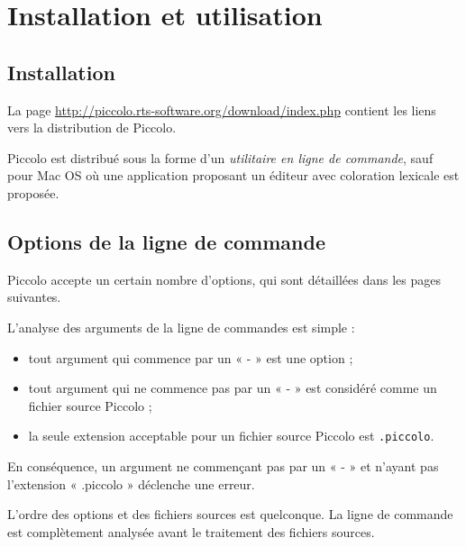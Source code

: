 
\cleardoublepage

\chapter{Installation et utilisation}

\thispagestyle{empty}


\section{Installation}

La page \url{http://piccolo.rts-software.org/download/index.php} contient les liens vers la distribution de Piccolo. 

Piccolo est distribué sous la forme d'un \emph{utilitaire en ligne de commande}, sauf pour Mac OS où une application proposant un éditeur avec coloration lexicale est proposée.





\section{Options de la ligne de commande}


Piccolo accepte un certain nombre d’options, qui sont détaillées dans les pages suivantes.

L’analyse des arguments de la ligne de commandes est simple :
\begin{itemize}
  \item tout argument qui commence par un « - » est une option ;
  \item tout argument qui ne commence pas par un « - » est considéré comme un fichier source Piccolo ;
  \item la seule extension acceptable pour un fichier source Piccolo est \texttt{.piccolo}.
\end{itemize}

En conséquence, un argument ne commençant pas par un « - » et n’ayant pas l’extension « .piccolo » déclenche une erreur.

L’ordre des options et des fichiers sources est quelconque. La ligne de commande est complètement analysée avant le traitement des fichiers sources.

